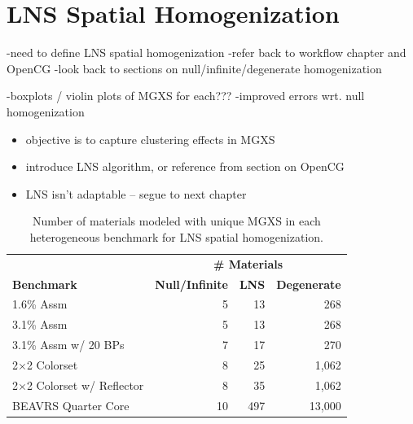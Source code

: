 \section{LNS Spatial Homogenization}
\label{sec:chap9-lns-homogenize}

-need to define \ac{LNS} spatial homogenization
-refer back to workflow chapter and OpenCG
-look back to sections on null/infinite/degenerate homogenization

-boxplots / violin plots of MGXS for each???
-improved errors wrt. null homogenization

\begin{itemize}[noitemsep]
  \item objective is to capture clustering effects in MGXS
  \item introduce LNS algorithm, or reference from section on OpenCG
  \item LNS isn't adaptable -- segue to next chapter
\end{itemize}

\begin{table}[h!]
  \centering
  \caption[Number of materials for LNS spatial homogenization]{Number of materials modeled with unique \ac{MGXS} in each heterogeneous benchmark for \ac{LNS} spatial homogenization.}
  \small
  \label{table:chap9-num-materials-lns}
  \vspace{6pt}
  \begin{tabular}{l r r r}
  \toprule
  \rowcolor{lightgray}
  & \multicolumn{3}{c}{\cellcolor{lightgray} \bf \# Materials} \\
  \multirow{-2}{*}{\cellcolor{lightgray} \bf Benchmark} &
  \multicolumn{1}{c}{\cellcolor{lightgray} \bf Null/Infinite} &
  \multicolumn{1}{c}{\cellcolor{lightgray} \bf \ac{LNS}} &
  \multicolumn{1}{c}{\cellcolor{lightgray} \bf Degenerate} \\
  \midrule
1.6\% Assm & 5 & 13 & 268 \\
  \midrule
3.1\% Assm & 5 & 13 & 268 \\
  \midrule
3.1\% Assm w/ 20 BPs & 7 & 17 & 270  \\
  \midrule
2$\times$2 Colorset & 8 & 25 & 1,062 \\
  \midrule
2$\times$2 Colorset w/ Reflector & 8 & 35 & 1,062 \\
  \midrule
\ac{BEAVRS} Quarter Core & 10 & 497 & 13,000 \\ %
  \bottomrule
\end{tabular}
\end{table}


